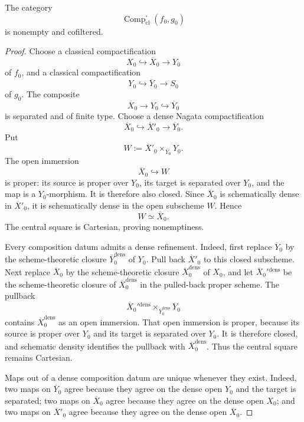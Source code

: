 \begin{proposition}
\label{prop:classical-composition-data-cofiltered}
The category
\[
    \operatorname{Comp}^{\square}_{\mathrm{cl}}(f_0,g_0)
\]
is nonempty and cofiltered.
\end{proposition}

\begin{proof}
Choose a classical compactification
\[
    X_0\hookrightarrow\overline X_0\longrightarrow Y_0
\]
of \(f_0\), and a classical compactification
\[
    Y_0\hookrightarrow\overline Y_0\longrightarrow S_0
\]
of \(g_0\).  The composite
\[
    \overline X_0\longrightarrow Y_0\hookrightarrow\overline Y_0
\]
is separated and of finite type.  Choose a dense Nagata compactification
\[
    \overline X_0
    \hookrightarrow
    \overline X'_0
    \longrightarrow
    \overline Y_0.
\]
Put
\[
    W
    :=
    \overline X'_0\times_{\overline Y_0}Y_0.
\]
The open immersion
\[
    \overline X_0\hookrightarrow W
\]
is proper: its source is proper over \(Y_0\), its target is separated over
\(Y_0\), and the map is a \(Y_0\)-morphism.  It is therefore also closed.
Since \(\overline X_0\) is schematically dense in \(\overline X'_0\), it is
schematically dense in the open subscheme \(W\).  Hence
\[
    W\simeq\overline X_0.
\]
The central square is Cartesian, proving nonemptiness.

Every composition datum admits a dense refinement.  Indeed, first
replace \(\overline Y_0\) by the scheme-theoretic closure
\(\overline Y_0^{\mathrm{dens}}\) of \(Y_0\).  Pull back
\(\overline X'_0\) to this closed subscheme.  Next replace
\(\overline X_0\) by the scheme-theoretic closure
\(\overline X_0^{\mathrm{dens}}\) of \(X_0\), and let
\(\overline X_0'{}^{\mathrm{dens}}\) be the scheme-theoretic closure of
\(\overline X_0^{\mathrm{dens}}\) in the pulled-back proper scheme.  The
pullback
\[
    \overline X_0'{}^{\mathrm{dens}}
    \times_{\overline Y_0^{\mathrm{dens}}}
    Y_0
\]
contains \(\overline X_0^{\mathrm{dens}}\) as an open immersion.  That open
immersion is proper, because its source is proper over \(Y_0\) and its
target is separated over \(Y_0\).  It is therefore closed, and schematic
density identifies the pullback with
\(\overline X_0^{\mathrm{dens}}\).  Thus the central square remains
Cartesian.

Maps out of a dense composition datum are unique whenever they exist.
Indeed, two maps on \(\overline Y_0\) agree because they agree on the dense
open \(Y_0\) and the target is separated; two maps on \(\overline X_0\)
agree because they agree on the dense open \(X_0\); and two maps on
\(\overline X'_0\) agree because they agree on the dense open
\(\overline X_0\).


\end{proof}
